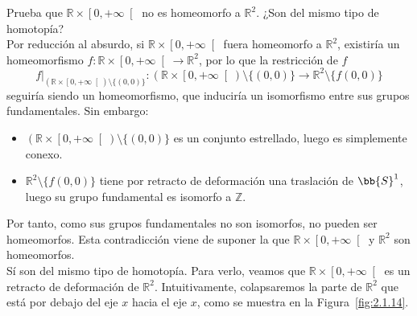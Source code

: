 \begin{ejercicio}
    Prueba que $\mathbb{R}\times \left[0,+\infty\right[$ no es homeomorfo a $\mathbb{R}^2$. ¿Son del mismo tipo de homotopía?\\

        \noindent
        Por reducción al absurdo, si $\mathbb{R}\times \left[0,+\infty\right[$ fuera homeomorfo a $\mathbb{R}^2$, existiría un homeomorfismo $f:\mathbb{R}\times \left[0,+\infty\right[\to \mathbb{R}^2$, por lo que la restricción de $f$ 
        $$f\big|_{(\mathbb{R}\times \left[0,+\infty\right[)\setminus\{(0,0)\}}:(\mathbb{R}\times \left[0,+\infty\right[)\setminus\{(0,0)\}\to \mathbb{R}^2\setminus\{f(0,0)\}$$
        seguiría siendo un homeomorfismo, que induciría un isomorfismo entre sus grupos fundamentales. Sin embargo:
        \begin{itemize}
            \item $(\mathbb{R}\times \left[0,+\infty\right[)\setminus\{(0,0)\}$ es un conjunto estrellado, luego es simplemente conexo.
            \item $\mathbb{R}^2\setminus\{f(0,0)\}$ tiene por retracto de deformación una traslación de $\bb{S}^1$, luego su grupo fundamental es isomorfo a $\mathbb{Z}$.
        \end{itemize}

        Por tanto, como sus grupos fundamentales no son isomorfos, no pueden ser homeomorfos. Esta contradicción viene de suponer la que $\mathbb{R}\times \left[0,+\infty\right[$ y $\mathbb{R}^2$ son homeomorfos.\\

        \noindent
        Sí son del mismo tipo de homotopía. Para verlo, veamos que $\mathbb{R}\times \left[0,+\infty\right[$ es un retracto de deformación de $\mathbb{R}^2$. Intuitivamente, colapsaremos la parte de $\mathbb{R}^2$ que está por debajo del eje $x$ hacia el eje $x$, como se muestra en la Figura~\ref{fig:2.1.14}.
        \begin{figure}[ht]
            \centering
\end{figure}
\end{ejercicio}
